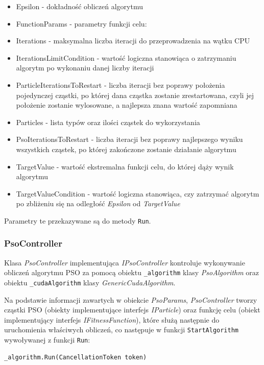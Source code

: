 \documentclass[12pt, twoside, openany, abstract=on]{report}
\theoremstyle{definition}
\begin{document}
\begin{itemize}
	\item Epsilon - dokładność obliczeń algorytmu
	\item FunctionParams - parametry funkcji celu: 
	
	\item Iterations - maksymalna liczba iteracji do przeprowadzenia na wątku CPU
	\item IterationsLimitCondition - wartość logiczna stanowiąca o zatrzymaniu algorytm po wykonaniu danej liczby iteracji
	\item ParticleIterationsToRestart - liczba iteracji bez poprawy położenia pojedynczej cząstki, po której dana cząstka zostanie zrestartowana, czyli jej położenie zostanie wylosowane, a najlepsza znana wartość zapomniana
	\item Particles - lista typów oraz ilości cząstek do wykorzystania
	\item PsoIterationsToRestart - liczba iteracji bez poprawy najlepszego wyniku wszystkich cząstek, po której zakończone zostanie działanie algorytmu
	\item TargetValue - wartość ekstremalna funkcji celu, do której dąży wynik algorytmu
	\item TargetValueCondition - wartość logiczna stanowiąca, czy zatrzymać algorytm po zbliżeniu się na odległość \emph{Epsilon} od \emph{TargetValue}
\end{itemize}

Parametry te przekazywane są do metody \texttt{Run}.

\subsubsection{PsoController}
Klasa \textit{PsoController} implementująca \textit{IPsoController} kontroluje wykonywanie obliczeń algorytmu PSO za pomocą obiektu \texttt{\_algorithm} klasy \textit{PsoAlgorithm} oraz obiektu \texttt{\_cudaAlgorithm} klasy \textit{GenericCudaAlgorithm}. 

Na podstawie informacji zawartych w obiekcie \textit{PsoParams}, \textit{PsoController} tworzy cząstki PSO (obiekty implementujące interfejs \textit{IParticle}) oraz funkcję celu (obiekt implementujący interfejs \textit{IFitnessFunction}), które służą następnie do uruchomienia właściwych obliczeń, co następuje w funkcji \texttt{StartAlgorithm} wywoływanej z funkcji \texttt{Run}:

\lstset{style=sharpc}
\begin{lstlisting}[frame=single]
_algorithm.Run(CancellationToken token)
\end{lstlisting}
\end{document}
